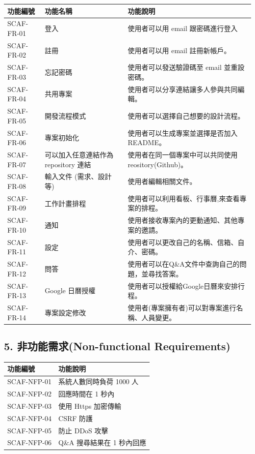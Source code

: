 \documentclass{report}
\begin{document}
\begin{tabularx}{\textwidth}{
  |p{}%
  |p{}%
  |p{}|%
}
  \hline
  功能編號 & 功能名稱 & 功能說明 \\ \hline
  SCAF-FR-01 & 登入 & 使用者可以用 email 跟密碼進行登入\\ \hline
  SCAF-FR-02 & 註冊 & 使用者可以用 email 註冊新帳戶。 \\ \hline
  SCAF-FR-03 & 忘記密碼 & 使用者可以發送驗證碼至 email 並重設密碼。 \\ \hline
  SCAF-FR-04 & 共用專案 & 使用者可以分享連結讓多人參與共同編輯。 \\ \hline
  SCAF-FR-05 & 開發流程模式 & 使用者可以選擇自己想要的設計流程。 \\ \hline
  SCAF-FR-06 & 專案初始化 & 使用者可以生成專案並選擇是否加入README。 \\ \hline
  SCAF-FR-07 & 可以加入任意連結作為 repository 連結 & 使用者在同一個專案中可以共同使用reository(Github)。 \\ \hline
  SCAF-FR-08 & 輸入文件 (需求、設計等) & 使用者編輯相關文件。 \\ \hline
  SCAF-FR-09 & 工作計畫排程 & 使用者可以利用看板、行事曆,來查看專案的排程。 \\ \hline
  SCAF-FR-10 & 通知 & 使用者接收專案內的更動通知、其他專案的邀請。 \\ \hline
  SCAF-FR-11 & 設定 & 使用者可以更改自己的名稱、信箱、自介、密碼。 \\ \hline
  SCAF-FR-12 & 問答 & 使用者可以在Q\&A文件中查詢自己的問題，並尋找答案。 \\ \hline
  SCAF-FR-13 & Google 日曆授權 & 使用者可以授權給Google日曆來安排行程。 \\ \hline 
  SCAF-FR-14 & 專案設定修改 & 使用者(專案擁有者)可以對專案進行名稱、人員變更。 \\ \hline
\end{tabularx}

\subsection*{5. 非功能需求(Non-functional Requirements)}

\begin{tabularx}{\textwidth}{
  |p{}%
  |p{}|%
}
  \hline
  功能編號 &  功能說明 \\ \hline
  SCAF-NFP-01 & 系統人數同時負荷 1000 人 \\ \hline
  SCAF-NFP-02 & 回應時間在 1 秒內 \\ \hline
  SCAF-NFP-03 & 使用 Https 加密傳輸 \\ \hline
  SCAF-NFP-04 & CSRF 防護 \\ \hline
  SCAF-NFP-05 & 防止 DDoS 攻擊 \\ \hline
  SCAF-NFP-06 & Q\&A 搜尋結果在 1 秒內回應 \\ \hline
\end{tabularx}
\end{document}
